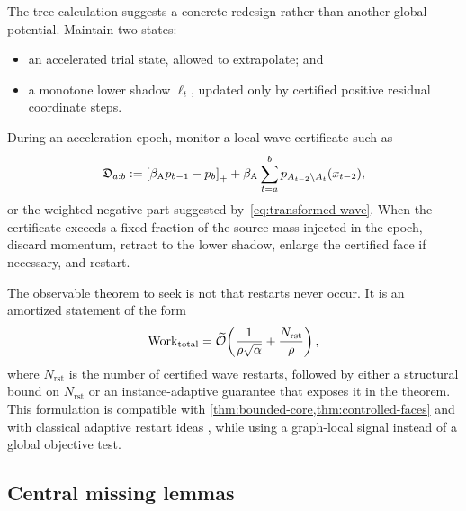 The tree calculation suggests a concrete redesign rather than another global
potential.  Maintain two states:
\begin{itemize}[leftmargin=*]
  \item an accelerated trial state, allowed to extrapolate; and
  \item a monotone lower shadow $\ell_t$, updated only by certified positive
  residual coordinate steps.
\end{itemize}
During an acceleration epoch, monitor a local wave certificate such as
\begin{equation}
 \mathfrak D_{a:b}
 :=\left[\beta_{\mathrm A} p_{b-1}-p_b\right]_{+}
   +\beta_{\mathrm A}\sum_{t=a}^b
     p_{A_{t-2}\setminus A_t}(x_{t-2}),
 \label{eq:epoch-flux}
\end{equation}
or the weighted negative part suggested by~\eqref{eq:transformed-wave}.
When the certificate exceeds a fixed fraction of the source mass injected in
the epoch, discard momentum, retract to the lower shadow, enlarge the certified
face if necessary, and restart.

The observable theorem to seek is not that restarts never occur.  It is an
amortized statement of the form
\begin{equation}
  \operatorname{Work}_{\mathrm{total}}
  =\widetilde{\mathcal{O}}\!\left(
      \frac1{\rho\sqrt\alpha}
      +\frac{N_{\mathrm{rst}}}{\rho}
    \right),
  \label{eq:restart-target}
\end{equation}
where $N_{\mathrm{rst}}$ is the number of certified wave restarts, followed by
either a structural bound on $N_{\mathrm{rst}}$ or an instance-adaptive
guarantee that exposes it in the theorem. This formulation is compatible with
\cref{thm:bounded-core,thm:controlled-faces} and with classical adaptive
restart ideas \citep{odonoghue2015adaptive}, while using a graph-local signal
instead of a global objective test.

\subsection{Central missing lemmas}

